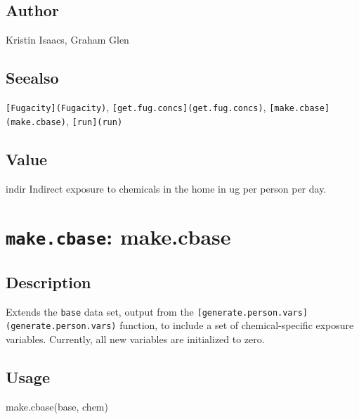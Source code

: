 \documentclass[
]{article}
\newenvironment{Shaded}{\begin{snugshade}}{\end{snugshade}}
\newcommand{\FunctionTok}[1]{\textcolor[rgb]{0.00,0.00,0.00}{#1}}
\newcommand{\NormalTok}[1]{#1}
\begin{document}
\hypertarget{author-21}{%
\subsection{Author}\label{author-21}}

Kristin Isaacs, Graham Glen

\hypertarget{seealso-17}{%
\subsection{Seealso}\label{seealso-17}}

\texttt{{[}Fugacity{]}(Fugacity)},
\texttt{{[}get.fug.concs{]}(get.fug.concs)},
\texttt{{[}make.cbase{]}(make.cbase)}, \texttt{{[}run{]}(run)}

\hypertarget{value-22}{%
\subsection{Value}\label{value-22}}

indir Indirect exposure to chemicals in the home in ug per person per
day.

\hypertarget{make.cbase-make.cbase}{%
\section{\texorpdfstring{\texttt{make.cbase}:
make.cbase}{make.cbase: make.cbase}}\label{make.cbase-make.cbase}}

\hypertarget{description-28}{%
\subsection{Description}\label{description-28}}

Extends the \texttt{base} data set, output from the
\texttt{{[}generate.person.vars{]}(generate.person.vars)} function, to
include a set of chemical-specific exposure variables. Currently, all
new variables are initialized to zero.

\hypertarget{usage-28}{%
\subsection{Usage}\label{usage-28}}

\begin{Shaded}
\begin{Highlighting}[]
\FunctionTok{make.cbase}\NormalTok{(base, chem)}
\end{Highlighting}
\end{Shaded}
\end{document}
